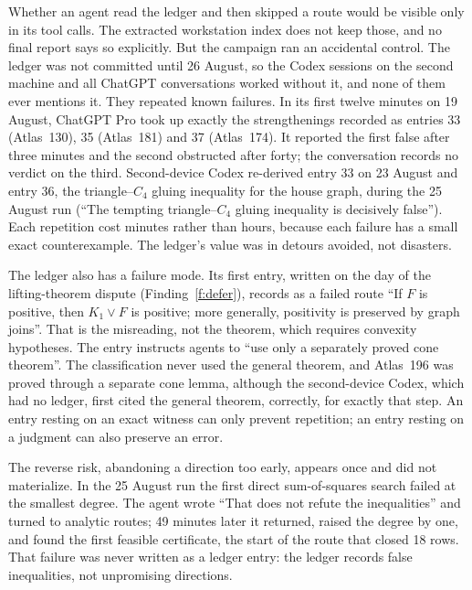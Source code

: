 \documentclass[11pt,a4paper]{article}
\begin{document}
Whether an agent read the ledger and then skipped a route would be visible only in its tool calls. The
extracted workstation index does not keep those, and no final report says so explicitly. But the campaign ran
an accidental control. The ledger was not committed until 26 August, so the Codex sessions on the second machine
and all ChatGPT conversations worked without it, and none of them ever mentions it. They repeated known
failures. In its first twelve minutes on 19 August, ChatGPT Pro took up exactly the strengthenings recorded as
entries 33 (Atlas~130), 35 (Atlas~181) and 37 (Atlas~174). It reported the first false after three minutes and
the second obstructed after forty; the conversation records no verdict on the third. Second-device Codex re-derived
entry 33 on 23 August and entry 36, the triangle--$C_4$ gluing inequality for the house graph, during the
25 August run (``The tempting triangle--$C_4$ gluing inequality is decisively false''). Each repetition cost
minutes rather than hours, because each failure has a small exact counterexample. The ledger's value was in
detours avoided, not disasters.

The ledger also has a failure mode. Its first entry, written on the day of the lifting-theorem dispute
(Finding~\ref{f:defer}), records as a failed route ``If $F$ is positive, then $K_1\vee F$ is positive; more
generally, positivity is preserved by graph joins''. That is the misreading, not the theorem, which requires
convexity hypotheses. The entry instructs agents to ``use only a separately proved cone theorem''. The
classification never used the general theorem, and Atlas~196 was proved through a separate cone lemma, although
the second-device Codex, which had no ledger, first cited the general theorem, correctly, for exactly that step.
An entry resting on an exact witness can only prevent repetition; an entry resting on a judgment can also
preserve an error.

The reverse risk, abandoning a direction too early, appears once and did not materialize. In the 25 August run
the first direct sum-of-squares search failed at the smallest degree. The agent wrote ``That does not refute the
inequalities'' and turned to analytic routes; 49 minutes later it returned, raised the degree by one, and found
the first feasible certificate, the start of the route that closed 18 rows. That failure was never written as a
ledger entry: the ledger records false inequalities, not unpromising directions.
\end{document}
